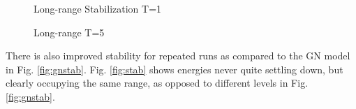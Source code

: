 \documentclass{article}
\begin{document}
	\begin{figure}[h]
	  \begin{floatrow}
	    {\caption{Long-range Stabilization T=1}
	  \label{fig:step5000}}
	  {\caption{Long-range T=5}
	  \label{fig:t5}}
	  \end{floatrow}
	\end{figure}
	
	There is also improved stability for repeated runs as compared to the GN model in Fig. \ref{fig:gnstab}. Fig. \ref{fig:stab} shows energies never quite settling down, but clearly occupying the same range, as opposed to different levels in Fig. \ref{fig:gnstab}.
\end{document}
